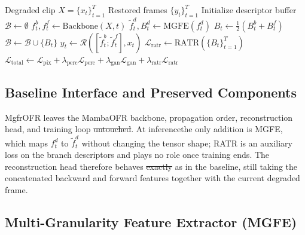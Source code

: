 \documentclass[symmetry,article,submit,pdftex,moreauthors]{Definitions/mdpi}
\providecommand{\DIFadd}[1]{{\protect\color{blue}\uwave{#1}}} %
\providecommand{\DIFdel}[1]{{\protect\color{red}\sout{#1}}}                      %
\providecommand{\DIFaddbegin}{} %
\providecommand{\DIFaddend}{} %
\providecommand{\DIFdelbegin}{} %
\providecommand{\DIFdelend}{} %
\begin{document}
\begin{algorithm}[H]
\caption{MgfrOFR forward pass for a clip of length $T$.\label{alg:mgfrofr}}
\begin{algorithmic}[1]
\Require Degraded clip $X=\{x_t\}_{t=1}^{T}$
\Ensure Restored frames $\{y_t\}_{t=1}^{T}$
\State Initialize descriptor buffer $\mathcal{B} \leftarrow \emptyset$
    \State $f_t^{b}, f_t^{f} \leftarrow \text{Backbone}(X, t)$ 
        \State $\widetilde{f}_t^{d}, B_t^{d} \leftarrow \text{MGFE}(f_t^{d})$ 
    \EndFor
    \State $B_t \leftarrow \frac{1}{2}(B_t^{b} + B_t^{f})$ 
    \State $\mathcal{B} \leftarrow \mathcal{B} \cup \{B_t\}$ 
    \State $y_t \leftarrow \mathcal{R}([\widetilde{f}_t^{b}; \widetilde{f}_t^{f}], x_t)$ 
\EndFor
{}
    \State $\mathcal{L}_{\text{ratr}} \leftarrow \text{RATR}(\{B_t\}_{t=1}^{T})$ 
    \State $\mathcal{L}_{\text{total}} \leftarrow \mathcal{L}_{\text{pix}} + \lambda_{\text{perc}}\mathcal{L}_{\text{perc}} + \lambda_{\text{gan}}\mathcal{L}_{\text{gan}} + \lambda_{\text{ratr}}\mathcal{L}_{\text{ratr}}$
\EndIf
\end{algorithmic}
\end{algorithm}

\subsection{Baseline Interface and Preserved Components}
\label{subsec:baseline_interface}

MgfrOFR leaves the MambaOFR backbone, propagation order, reconstruction head, and training loop \DIFdelbegin \DIFdel{untouched}\DIFdelend \DIFaddbegin \DIFadd{unchanged}\DIFaddend . At inference\DIFaddbegin \DIFadd{, }\DIFaddend the only addition is MGFE, which maps $f_t^{d}$ to $\widetilde{f}_t^{d}$ without changing the tensor shape; RATR is an auxiliary loss on the branch descriptors and plays no role once training ends. The reconstruction head therefore behaves \DIFdelbegin \DIFdel{exactly }\DIFdelend as in the baseline, still taking the concatenated backward and forward features together with the current degraded frame.

\subsection{Multi-Granularity Feature Extractor (MGFE)}
\label{subsec:mgfe}
\end{document}
